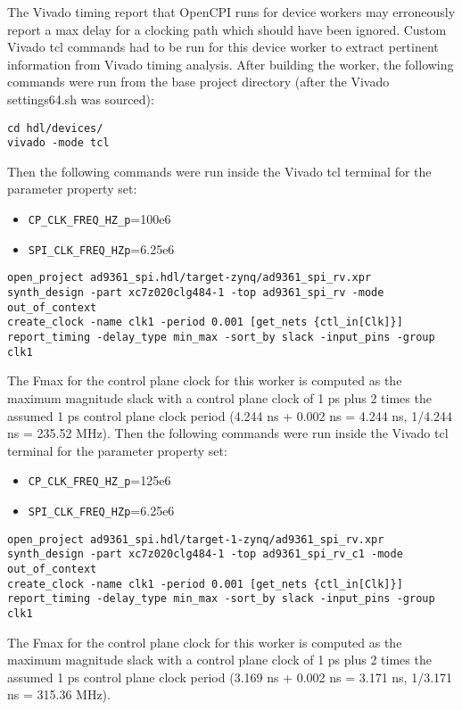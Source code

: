 The Vivado timing report that OpenCPI runs for device workers may erroneously report a max delay for a clocking path which should have been ignored. Custom Vivado tcl commands had to be run for this device worker to extract pertinent information from Vivado timing analysis. After building the worker, the following commands were run from the base project directory (after the Vivado settings64.sh was sourced):
\begin{lstlisting}
cd hdl/devices/
vivado -mode tcl
\end{lstlisting}
Then the following commands were run inside the Vivado tcl terminal for the parameter property set:
\begin{itemize}
	\item \verb+CP_CLK_FREQ_HZ_p+=100e6
	\item \verb+SPI_CLK_FREQ_HZp+=6.25e6
\end{itemize}
\begin{lstlisting}
open_project ad9361_spi.hdl/target-zynq/ad9361_spi_rv.xpr
synth_design -part xc7z020clg484-1 -top ad9361_spi_rv -mode out_of_context
create_clock -name clk1 -period 0.001 [get_nets {ctl_in[Clk]}]
report_timing -delay_type min_max -sort_by slack -input_pins -group clk1
\end{lstlisting}
The Fmax for the control plane clock for this worker is computed as the maximum magnitude slack with a control plane clock of 1 ps plus 2 times the assumed 1 ps control plane clock period (4.244 ns + 0.002 ns = 4.244 ns, 1/4.244 ns = 235.52 MHz).
Then the following commands were run inside the Vivado tcl terminal for the parameter property set:
\begin{itemize}
	\item \verb+CP_CLK_FREQ_HZ_p+=125e6
	\item \verb+SPI_CLK_FREQ_HZp+=6.25e6
\end{itemize}
\begin{lstlisting}
open_project ad9361_spi.hdl/target-1-zynq/ad9361_spi_rv.xpr
synth_design -part xc7z020clg484-1 -top ad9361_spi_rv_c1 -mode out_of_context
create_clock -name clk1 -period 0.001 [get_nets {ctl_in[Clk]}]
report_timing -delay_type min_max -sort_by slack -input_pins -group clk1
\end{lstlisting}
The Fmax for the control plane clock for this worker is computed as the maximum magnitude slack with a control plane clock of 1 ps plus 2 times the assumed 1 ps control plane clock period (3.169 ns + 0.002 ns = 3.171 ns, 1/3.171 ns = 315.36 MHz).


